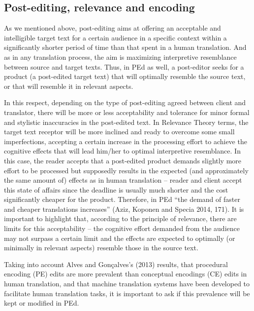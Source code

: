 \documentclass[output=paper]{langsci/langscibook}
\begin{document}
\subsection{Post-editing, relevance and encoding}

As we mentioned above, post-editing aims at offering an acceptable and intelligible target text for a certain audience in a specific context within a significantly shorter period of time than that spent in a human translation. And as in any translation process, the aim is maximizing interpretive resemblance between source and target texts. Thus, in PEd as well, a post-editor seeks for a product (a post-edited target text) that will optimally resemble the source text, or that will resemble it in relevant aspects. 


In this respect, depending on the type of post-editing agreed between client and translator, there will be more or less acceptability and tolerance for minor formal and stylistic inaccuracies in the post-edited text. In Relevance Theory terms, the target text receptor will be more inclined and ready to overcome some small imperfections, accepting a certain increase in the processing effort to achieve the cognitive effects that will lead him/her to optimal interpretive resemblance. In this case, the reader accepts that a post-edited product demands slightly more effort to be processed but supposedly results in the expected (and approximately the same amount of) effects as in human translation – reader and client accept this state of affairs since the deadline is usually much shorter and the cost significantly cheaper for the product. Therefore, in PEd “the demand of faster and cheaper translations increases” (Aziz, Koponen and Specia 2014, 171). It is important to highlight that, according to the principle of relevance, there are limits for this acceptability – the cognitive effort demanded from the audience may not surpass a certain limit and the effects are expected to optimally (or minimally in relevant aspects) resemble those in the source text.



Taking into account Alves and Gonçalves’s (2013) results, that procedural encoding (PE) edits are more prevalent than conceptual encodings (CE) edits in human translation, and that machine translation systems have been developed to facilitate human translation tasks, it is important to ask if this prevalence will be kept or modified in PEd.
\end{document}

